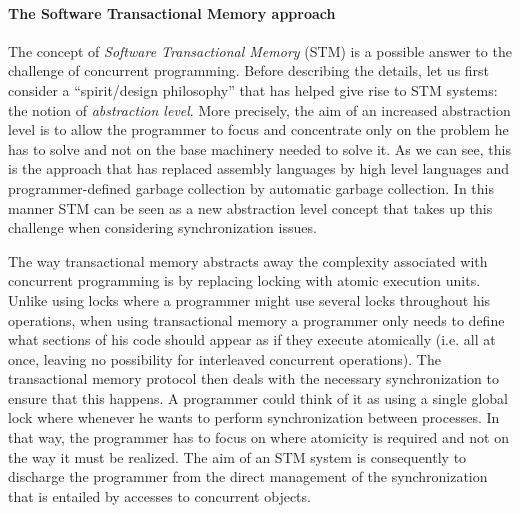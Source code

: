 \documentclass[runningheads,a4paper]{article}
\begin{document}


\paragraph{The Software Transactional Memory approach}
The concept of {\it Software Transactional  Memory}   (STM)  is  a possible answer  
to   the  challenge of concurrent programming.
Before describing the details, let us first consider a ``spirit/design philosophy'' that has helped give
rise to  STM systems: the notion of 
{\it abstraction level}.
More precisely,  the  aim of an increased abstraction level is   to allow  the programmer  to  focus and
concentrate only  on the problem  he has to
solve and not on the base machinery needed to solve it. 
As we can see, this is the approach  that  has   replaced assembly languages  
by  high level languages and programmer-defined garbage collection 
by automatic garbage collection.
In this manner STM can  be seen as a  new abstraction level concept
that takes  up  this challenge when considering synchronization issues.

The way transactional memory abstracts away the  complexity associated with 
concurrent programming is   by  replacing locking  with  atomic
execution units.
Unlike using locks where a programmer might use several locks
throughout his operations, when using transactional memory
a programmer only needs to define what sections of his code should
appear as if they execute atomically (i.e. all at once, leaving
no possibility for interleaved concurrent operations).
The transactional memory protocol then deals with the necessary
synchronization to ensure that this happens.
A programmer could think of it as using a single global lock
where whenever he wants to perform synchronization between processes.
In  that way, the programmer has to focus on  where 
atomicity is required and  not on the  way it must be realized. The aim of
an STM system is consequently  to  discharge the programmer from the direct 
management  of  the  synchronization  that  is entailed  by   accesses   to
concurrent  objects.  
\end{document}

